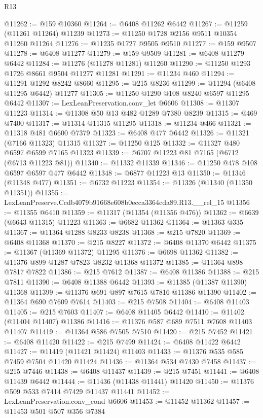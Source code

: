\begin{lexlean}{R13}
\begin{coremodule}
@11262 := @159 @10360
@11264 := @6408 @11262 @6442
@11267 := @11259 (@11261 @11264) @11239
@11273 := @11250 @1728 @2156 @9511 @10354 @11260 @11264
@11276 := @11235 @1727 @9505 @9510
@11277 := @159 @9507
@11278 := @6408 @11277
@11279 := @159 @9509
@11281 := @6408 @11279 @6442
@11284 := @11276 (@11278 @11281) @11260
@11290 := @11250 @1293 @1726 @8661 @9504 @11277 @11281
@11291 := @11234 @460
@11294 := @11291 @1292 @8242 @8660
@11295 := @215 @8236
@11299 := @11294 (@6408 @11295 @6442) @11277
@11305 := @11250 @1290 @108 @8240 @6597 @11295 @6442
@11307 := LexLeanPreservation.conv_let @6606
@11308 := @11307 @11223
@11314 := @11308 @50 @13 @482 @1289 @7380 @8239
@11315 := @469 @7400
@11317 := @11314 @11315 @11295
@11318 := @11234 @466
@11321 := @11318 @481 @6600 @7379
@11323 := @6408 @477 @6442
@11326 := @11321 (@7166 @11323) @11315
@11327 := @11250 @125
@11332 := @11327 @480 @6597 @6599 @7165 @11323
@11339 := @6707 @11223 @81 @7165 (@6712 (@6713 @11223 @81))
@11340 := @11332 @11339
@11346 := @11250 @478 @108 @6597 @6597 @477 @6442
@11348 := @6877 @11223 @13
@11350 := @11346 (@11348 @477)
@11351 := @6732 @11223
@11354 := @11326 (@11340 (@11350 @11351))
@11355 := LexLeanPreserve.Ccdb4079b91668e608b0ecca3364cda89.R13.__rel_15
@11356 := @11355 @6410
@11359 := @11317 (@11354 (@11356 @476))
@11362 := @6639 (@6643 @11315) @11223
@11363 := @6682 @11362
@11364 := @11363 @335
@11367 := @11364 @1288 @8233 @8238
@11368 := @215 @7820
@11369 := @6408 @11368
@11370 := @215 @8227
@11372 := @6408 @11370 @6442
@11375 := @11367 (@11369 @11372) @11295
@11376 := @6698 @11362
@11382 := @11376 @899 @1287 @7823 @8232 @11368 @11372
@11385 := @11364 @898 @7817 @7822
@11386 := @215 @7612
@11387 := @6408 @11386
@11388 := @215 @7811
@11390 := @6408 @11388 @6442
@11393 := @11385 (@11387 @11390) @11368
@11399 := @11376 @691 @897 @7615 @7816 @11386 @11390
@11402 := @11364 @690 @7609 @7614
@11403 := @215 @7508
@11404 := @6408 @11403
@11405 := @215 @7603
@11407 := @6408 @11405 @6442
@11410 := @11402 (@11404 @11407) @11386
@11416 := @11376 @587 @689 @7511 @7608 @11403 @11407
@11419 := @11364 @586 @7505 @7510
@11420 := @215 @7452
@11421 := @6408 @11420
@11422 := @215 @7499
@11424 := @6408 @11422 @6442
@11427 := @11419 (@11421 @11424) @11403
@11433 := @11376 @535 @585 @7459 @7504 @11420 @11424
@11436 := @11364 @534 @7430 @7458
@11437 := @215 @7446
@11438 := @6408 @11437
@11439 := @215 @7451
@11441 := @6408 @11439 @6442
@11444 := @11436 (@11438 @11441) @11420
@11450 := @11376 @509 @533 @7414 @7429 @11437 @11441
@11452 := LexLeanPreservation.conv_cond @6606
@11453 := @11452 @11362
@11457 := @11453 @501 @507 @356 @7384

\end{coremodule}
\end{lexlean}
